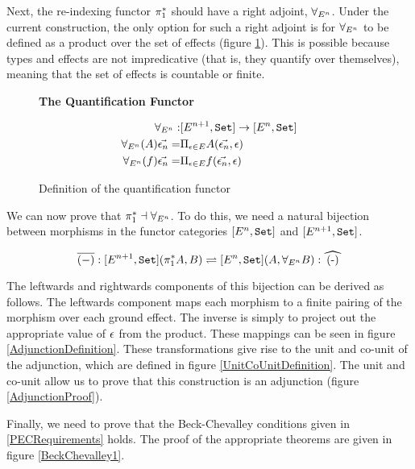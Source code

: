 \documentclass{Report}
\begin{document}
Next, the re-indexing functor $\pi_1^*$ should have a right adjoint, $\forall_{E^n}$. Under the current construction, the only option for such a right adjoint is for $\forall_{E^n}$ to be defined as a product over the set of effects (figure \ref{ProductQuantification}). This is possible because types and effects are not impredicative (that is, they quantify over themselves), meaning that the set of effects is countable or finite.

\begin{figure}
    \begin{framed}
        \centering
        \textbf{The Quantification Functor}

        \begin{align*}
            \forall_{E^n}:& [E^{n+1}, \texttt{Set}] \rightarrow [E^n, \texttt{Set}]\\
            \forall_{E^n}(A)\vec{\epsilon_n} =&\Pi_{\epsilon\in E}{A(\vec{\epsilon_n}, \epsilon)}
            \\ 
            \forall_{E^n}(f)\vec{\epsilon_n} =&\Pi_{\epsilon\in E}{f(\vec{\epsilon_n}, \epsilon)}
        \end{align*}
        
    \end{framed}
    \caption{Definition of the quantification functor}
    \label{ProductQuantification}
\end{figure}



We can now prove that $\pi_1^* \dashv \forall_{E^n}$. To do this, we need a natural bijection between morphisms in the functor categories $[E^n, \texttt{Set}]$ and $[E^{n+1}, \texttt{Set}]$.

\begin{equation}
    \bar{(-)}: [E^{n+1}, \set](\pstar A, B) \rightleftharpoons [E^n,\set] (A, \allEn B): \widehat{(-)}
\end{equation}

The leftwards and rightwards components of this bijection can be derived as follows. The leftwards component maps each morphism to a finite pairing of the morphism over each ground effect. The inverse is simply to project out the appropriate value of $\epsilon$ from the product. These mappings can be seen in figure \ref{AdjunctionDefinition}. These transformations give rise to the unit and co-unit of the adjunction, which are defined in figure \ref{UnitCoUnitDefinition}. The unit and co-unit allow us to prove that this construction is an adjunction (figure \ref{AdjunctionProof}). 

Finally, we need to prove that the Beck-Chevalley conditions given in \ref{PECRequirements} holds. The proof of the appropriate theorems are given in figure \ref{BeckChevalley1}.
\end{document}
